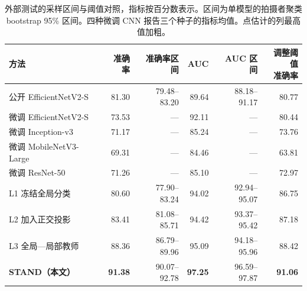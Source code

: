 \begin{table}[htbp]
\centering\small
\caption{外部测试的采样区间与阈值对照，指标按百分数表示。区间为单模型的拍摄者聚类 bootstrap 95\% 区间。四种微调 CNN 报告三个种子的指标均值。点估计的列最高值加粗。}
\label{tab:external_details}
\begin{adjustbox}{max width=\linewidth}
\begin{tabular}{lrrrrr}
\toprule
方法 & 准确率 & 准确率区间 & AUC & AUC 区间 & \makecell{调整阈值\\准确率}\\
\midrule
公开 EfficientNetV2-S\cite{tan2021,waldo2026} & 81.30 & 79.48--83.20 & 89.64 & 88.18--91.17 & 80.77\\
微调 EfficientNetV2-S\cite{tan2021} & 73.53 & --- & 92.11 & --- & 80.44\\
微调 Inception-v3\cite{szegedy2016} & 71.17 & --- & 85.24 & --- & 73.76\\
微调 MobileNetV3-Large\cite{howard2019} & 69.31 & --- & 84.46 & --- & 63.81\\
微调 ResNet-50\cite{he2016} & 71.26 & --- & 85.10 & --- & 72.97\\
L1 冻结全局分类\cite{simeoni2026} & 80.60 & 77.90--83.24 & 94.02 & 92.94--95.07 & 86.75\\
L2 加入正交投影 & 83.41 & 81.08--85.71 & 94.42 & 93.37--95.42 & 87.18\\
L3 全局—局部教师 & 88.36 & 86.79--89.96 & 95.09 & 94.18--95.96 & 88.42\\
\textbf{STAND（本文）} & \textbf{91.38} & 90.07--92.78 & \textbf{97.25} & 96.59--97.87 & \textbf{91.06}\\
\bottomrule
\end{tabular}
\end{adjustbox}
\end{table}
